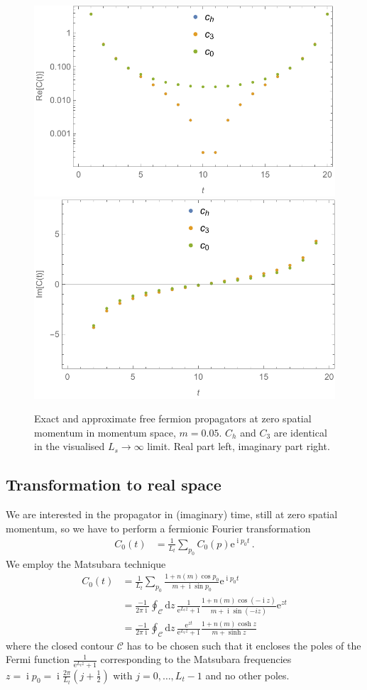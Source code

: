 \documentclass[a4paper]{article}
\DeclareMathOperator{\im}{i}
\newcommand{\eto}[1]{\ensuremath{\mathrm{e}^{#1}}}
\newcommand{\md}{\ensuremath{\mathrm{d}}}
\begin{document}
	\begin{figure}[htp]
		\centering
		\includegraphics[width=.45\textwidth]{free-prop_mom-space}
		\includegraphics[width=.45\textwidth]{free-prop_mom-space_im}
		\caption{Exact and approximate free fermion propagators at zero spatial momentum in momentum space, $m=\num{0.05}$. $C_h$ and $C_3$ are identical in the visualised $L_s\rightarrow\infty$ limit. Real part left, imaginary part right.}\label{fig:free_prop_mom_space}
	\end{figure}

	\subsection{Transformation to real space}
	We are interested in the propagator in (imaginary) time, still at zero spatial momentum, so we have to perform a fermionic Fourier transformation
	\begin{align}
	C_0(t)&=\frac{1}{L_t}\sum_{p_0}C_0(p)\eto{\im p_0 t}\,.
	\end{align}
	We employ the Matsubara technique
	\begin{align}
	C_0(t)&=\frac{1}{L_t}\sum_{p_0}\frac{1+n(m)\cos p_0}{m+\im \sin p_0}\eto{\im p_0 t}\\
	&=\frac{-1}{2\pi\im}\oint_\mathcal{C}\md z\, \frac{1}{\eto{L_t z}+1}\frac{1+n(m)\cos(-\im z)}{m+\im \sin (-iz)}\eto{z t}\\
	&=\frac{-1}{2\pi\im}\oint_\mathcal{C}\md z\, \frac{\eto{z t}}{\eto{L_t z}+1}\frac{1+n(m)\cosh z}{m+\sinh z}\label{eq:contour_int_C}
	\end{align}
	where the closed contour $\mathcal{C}$ has to be chosen such that it encloses the poles of the Fermi function $\frac{1}{\eto{L_t z}+1}$ corresponding to the Matsubara frequencies $z=\im p_0=\im\frac{2\pi}{L_t}\left(j+\frac 12\right)$ with $j=0,\dots,L_t-1$ and no other poles.
	
\end{document}
